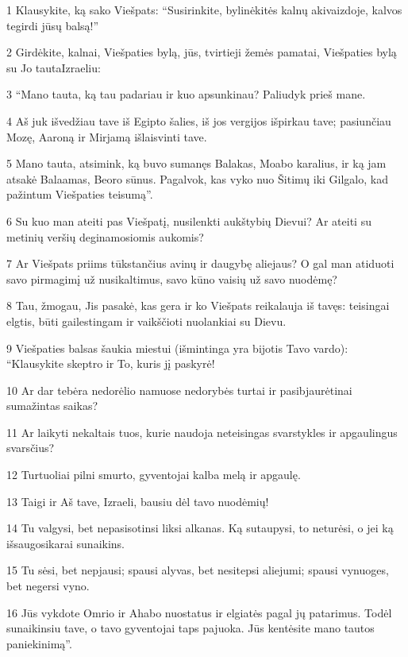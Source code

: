 \par 1 Klausykite, ką sako Viešpats: “Susirinkite, bylinėkitės kalnų akivaizdoje, kalvos tegirdi jūsų balsą!” 
\par 2 Girdėkite, kalnai, Viešpaties bylą, jūs, tvirtieji žemės pamatai, Viešpaties bylą su Jo tauta­Izraeliu: 
\par 3 “Mano tauta, ką tau padariau ir kuo apsunkinau? Paliudyk prieš mane. 
\par 4 Aš juk išvedžiau tave iš Egipto šalies, iš jos vergijos išpirkau tave; pasiunčiau Mozę, Aaroną ir Mirjamą išlaisvinti tave. 
\par 5 Mano tauta, atsimink, ką buvo sumanęs Balakas, Moabo karalius, ir ką jam atsakė Balaamas, Beoro sūnus. Pagalvok, kas vyko nuo Šitimų iki Gilgalo, kad pažintum Viešpaties teisumą”. 
\par 6 Su kuo man ateiti pas Viešpatį, nusilenkti aukštybių Dievui? Ar ateiti su metinių veršių deginamosiomis aukomis? 
\par 7 Ar Viešpats priims tūkstančius avinų ir daugybę aliejaus? O gal man atiduoti savo pirmagimį už nusikaltimus, savo kūno vaisių už savo nuodėmę? 
\par 8 Tau, žmogau, Jis pasakė, kas gera ir ko Viešpats reikalauja iš tavęs: teisingai elgtis, būti gailestingam ir vaikščioti nuolankiai su Dievu. 
\par 9 Viešpaties balsas šaukia miestui (išmintinga yra bijotis Tavo vardo): “Klausykite skeptro ir To, kuris jį paskyrė! 
\par 10 Ar dar tebėra nedorėlio namuose nedorybės turtai ir pasibjaurėtinai sumažintas saikas? 
\par 11 Ar laikyti nekaltais tuos, kurie naudoja neteisingas svarstykles ir apgaulingus svarsčius? 
\par 12 Turtuoliai pilni smurto, gyventojai kalba melą ir apgaulę. 
\par 13 Taigi ir Aš tave, Izraeli, bausiu dėl tavo nuodėmių! 
\par 14 Tu valgysi, bet nepasisotinsi­ liksi alkanas. Ką sutaupysi, to neturėsi, o jei ką išsaugosi­karai sunaikins. 
\par 15 Tu sėsi, bet nepjausi; spausi alyvas, bet nesitepsi aliejumi; spausi vynuoges, bet negersi vyno. 
\par 16 Jūs vykdote Omrio ir Ahabo nuostatus ir elgiatės pagal jų patarimus. Todėl sunaikinsiu tave, o tavo gyventojai taps pajuoka. Jūs kentėsite mano tautos paniekinimą”.



